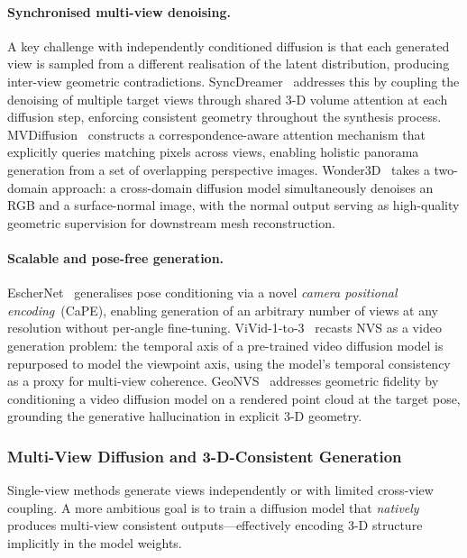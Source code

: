\paragraph{Synchronised multi-view denoising.}
A key challenge with independently conditioned diffusion is that each generated
view is sampled from a different realisation of the latent distribution,
producing inter-view geometric contradictions.
SyncDreamer~\citep{liu2023syncdreamer} addresses this by coupling the denoising
of multiple target views through shared 3-D volume attention at each diffusion
step, enforcing consistent geometry throughout the synthesis process.
MVDiffusion~\citep{tang2023mvdiffusion} constructs a correspondence-aware attention
mechanism that explicitly queries matching pixels across views, enabling
holistic panorama generation from a set of overlapping perspective images.
Wonder3D~\citep{long2024wonder3d} takes a two-domain approach: a cross-domain
diffusion model simultaneously denoises an RGB and a surface-normal image,
with the normal output serving as high-quality geometric supervision for
downstream mesh reconstruction.

\paragraph{Scalable and pose-free generation.}
EscherNet~\citep{kong2024eschernet} generalises pose conditioning via a
novel \emph{camera positional encoding}~(CaPE), enabling generation of
an arbitrary number of views at any resolution without per-angle fine-tuning.
ViVid-1-to-3~\citep{kwak2024vivid} recasts NVS as a video generation problem:
the temporal axis of a pre-trained video diffusion model is repurposed to model
the viewpoint axis, using the model's temporal consistency as a proxy for
multi-view coherence.
GeoNVS~\citep{chen2024geonvs} addresses geometric fidelity by conditioning a
video diffusion model on a rendered point cloud at the target pose, grounding
the generative hallucination in explicit 3-D geometry.

\subsubsection{Multi-View Diffusion and 3-D-Consistent Generation}

Single-view methods generate views independently or with limited cross-view
coupling.
A more ambitious goal is to train a diffusion model that \emph{natively}
produces multi-view consistent outputs---effectively encoding 3-D structure
implicitly in the model weights.

